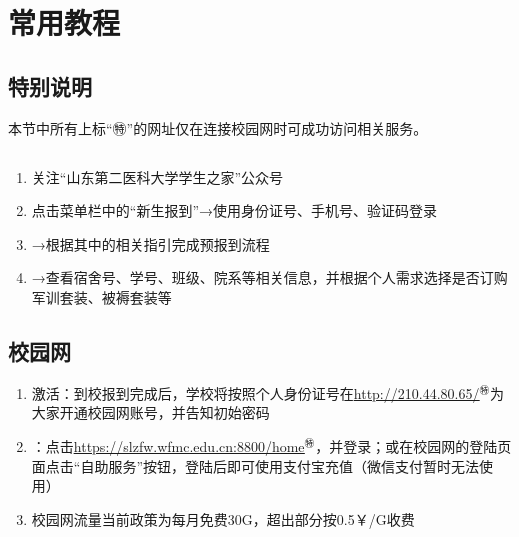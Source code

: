 \chapter[常用教程]{常用教程}

\section*{特别说明}
本节中所有上标“㊕”的网址仅在连接校园网时可成功访问相关服务。

\section[新生信息查询]{}
\label{freshman_query}
\begin{enumerate}
      \item 关注“山东第二医科大学学生之家”公众号
      \item 点击菜单栏中的“新生报到”→使用身份证号、手机号、验证码登录
      \item →根据其中的相关指引完成预报到流程
      \item →查看宿舍号、学号、班级、院系等相关信息，并根据个人需求选择是否订购军训套装、被褥套装\footnotemark 等
\end{enumerate}

\section[校园网]{校园网}
\label{wifi_register}
\begin{enumerate}
      \item 激活：到校报到完成后，学校将按照个人身份证号在\uline{\href{http://210.44.80.65/}{http://210.44.80.65/}$^㊕$}为大家开通校园网账号，并告知初始密码\footnotemark
      \item \textbf{}：点击\uline{\href{https://slzfw.wfmc.edu.cn:8800/home/}{https://slzfw.wfmc.edu.cn:8800/home}$^㊕$}，并登录；或在校园网的登陆页面点击“自助服务”按钮\footnotemark，登陆后即可使用支付宝充值（微信支付暂时无法使用）
      \item 校园网流量当前政策为每月免费30G，超出部分按0.5\textsf{￥}/G收费
\end{enumerate}


